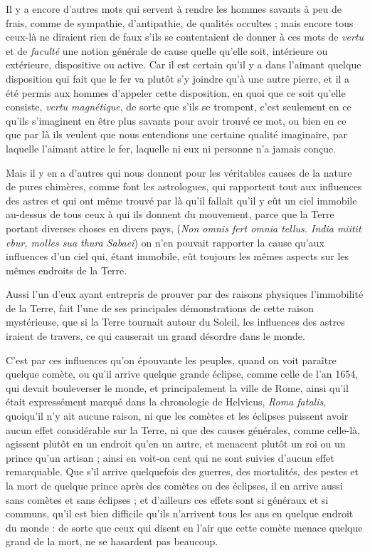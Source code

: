 Il y a encore d'autres mots qui servent à rendre les hommes savants à peu de frais, comme de sympathie, d'antipathie, de qualités occultes ; mais encore tous ceux-là ne diraient rien de faux s'ils se contentaient de donner à ces mots de \emph{vertu} et de \emph{faculté} une notion générale de cause quelle qu'elle soit, intérieure ou extérieure, dispositive ou active. Car il est certain qu'il y a dans l'aimant quelque disposition qui fait que le fer va plutôt s'y joindre qu'à une autre pierre, et il a été permis aux hommes d'appeler cette disposition, en quoi que ce soit qu'elle consiste, \emph{vertu magnétique}, de sorte que s'ils se trompent, c'est seulement en ce qu'ils s'imaginent en être plus savants pour avoir trouvé ce mot, ou bien en ce que par là ils veulent que nous entendions une certaine qualité imaginaire, par laquelle l'aimant attire le fer, laquelle ni eux ni personne n'a jamais conçue.

Mais il y en a d'autres qui nous donnent pour les véritables causes de la nature de pures chimères, comme font les astrologues, qui rapportent tout aux influences des astres et qui ont même trouvé par là qu'il fallait qu'il y eût un ciel immobile au-dessus de tous ceux à qui ils donnent du mouvement, parce que la Terre portant diverses choses en divers pays, (\emph{Non omnis fert omnia tellus. India miitit ebur, molles sua thura Sabaei}) on n'en pouvait rapporter la cause qu'aux influences d'un ciel qui, étant immobile, eût toujours les mêmes aspects sur les mêmes endroits de la Terre.

Aussi l'un d'eux ayant entrepris de prouver par des raisons physiques l'immobilité de la Terre, fait l'une de ses principales démonstrations de cette raison mystérieuse, que si la Terre tournait autour du Soleil, les influences des astres iraient de travers, ce qui causerait un grand désordre dans le monde.

C'est par ces influences qu'on épouvante les peuples, quand on voit paraître quelque comète, ou qu'il arrive quelque grande éclipse, comme celle de l'an 1654, qui devait bouleverser le monde, et principalement la ville de Rome, ainsi qu'il était expressément marqué dans la chronologie de Helvicus, \emph{Roma fatalis}, quoiqu'il n'y ait aucune raison, ni que les comètes et les éclipses puissent avoir aucun effet considérable sur la Terre, ni que des causes générales, comme celle-là, agissent plutôt en un endroit qu'en un autre, et menacent plutôt un roi ou un prince qu'un artisan ; ainsi en voit-on cent qui ne sont suivies d'aucun effet remarquable. Que s'il arrive quelquefois des guerres, des mortalités, des pestes et la mort de quelque prince après des comètes ou des éclipses, il en arrive aussi sans comètes et sans éclipses ; et d'ailleurs ces effets sont si généraux et si communs, qu'il est bien difficile qu'ils n'arrivent tous les ans en quelque endroit du monde : de sorte que ceux qui disent en l'air que cette comète menace quelque grand de la mort, ne se hasardent pas beaucoup.

